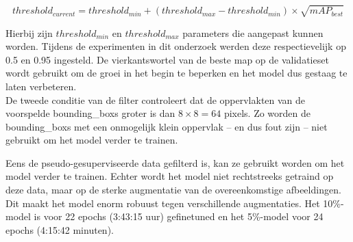 $$
threshold_{current} = threshold_{min} + (threshold_{max} - threshold_{min}) \times \sqrt{mAP_{best}}
$$

Hierbij zijn $threshold_{min}$ en $threshold_{max}$ parameters die aangepast kunnen worden. Tijdens de experimenten in dit onderzoek werden deze respectievelijk op 0.5 en 0.95 ingesteld. De vierkantswortel van de beste \gls{map} op de validatieset wordt gebruikt om de groei in het begin te beperken en het model dus gestaag te laten verbeteren. \\

De tweede conditie van de filter controleert dat de oppervlakten van de voorspelde \glspl{bounding_box} groter is dan $8 \times 8 = 64$ pixels. Zo worden de \glspl{bounding_box} met een onmogelijk klein oppervlak -- en dus fout zijn -- niet gebruikt om het model verder te trainen.

Eens de pseudo-gesuperviseerde data gefilterd is, kan ze gebruikt worden om het model verder te trainen. Echter wordt het model niet rechtstreeks getraind op deze data, maar op de sterke augmentatie van de overeenkomstige afbeeldingen. Dit maakt het model enorm robuust tegen verschillende augmentaties. Het 10\%-model is voor 22 epochs (3:43:15 uur) gefinetuned en het 5\%-model voor 24 epochs (4:15:42 minuten).